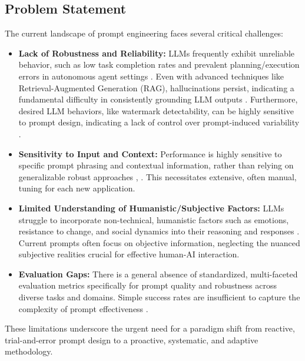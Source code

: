 \documentclass{article}
\newcommand{\citePone}{\cite{paper1}}
\newcommand{\citePtwo}{\cite{paper2}}
\newcommand{\citePthree}{\cite{paper3}}
\newcommand{\citePfive}{\cite{paper5}}
\begin{document}
\subsection{Problem Statement}
The current landscape of prompt engineering faces several critical challenges:
\begin{itemize}[noitemsep]
    \item \textbf{Lack of Robustness and Reliability:} LLMs frequently exhibit unreliable behavior, such as low task completion rates and prevalent planning/execution errors in autonomous agent settings \citePone{}. Even with advanced techniques like Retrieval-Augmented Generation (RAG), hallucinations persist, indicating a fundamental difficulty in consistently grounding LLM outputs \citePfive{}. Furthermore, desired LLM behaviors, like watermark detectability, can be highly sensitive to prompt design, indicating a lack of control over prompt-induced variability \citePthree{}.
    \item \textbf{Sensitivity to Input and Context:} Performance is highly sensitive to specific prompt phrasing and contextual information, rather than relying on generalizable robust approaches \citePthree{}, \citePfive{}. This necessitates extensive, often manual, tuning for each new application.
    \item \textbf{Limited Understanding of Humanistic/Subjective Factors:} LLMs struggle to incorporate non-technical, humanistic factors such as emotions, resistance to change, and social dynamics into their reasoning and responses \citePtwo{}. Current prompts often focus on objective information, neglecting the nuanced subjective realities crucial for effective human-AI interaction.
    \item \textbf{Evaluation Gaps:} There is a general absence of standardized, multi-faceted evaluation metrics specifically for prompt quality and robustness across diverse tasks and domains. Simple success rates are insufficient to capture the complexity of prompt effectiveness \citePone{}.
\end{itemize}
These limitations underscore the urgent need for a paradigm shift from reactive, trial-and-error prompt design to a proactive, systematic, and adaptive methodology.
\end{document}
